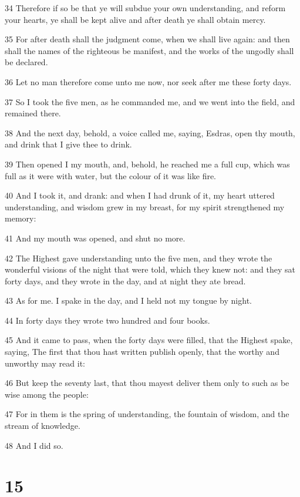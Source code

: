 \par 34 Therefore if so be that ye will subdue your own understanding, and reform your hearts, ye shall be kept alive and after death ye shall obtain mercy.
\par 35 For after death shall the judgment come, when we shall live again: and then shall the names of the righteous be manifest, and the works of the ungodly shall be declared.
\par 36 Let no man therefore come unto me now, nor seek after me these forty days.
\par 37 So I took the five men, as he commanded me, and we went into the field, and remained there.
\par 38 And the next day, behold, a voice called me, saying, Esdras, open thy mouth, and drink that I give thee to drink.
\par 39 Then opened I my mouth, and, behold, he reached me a full cup, which was full as it were with water, but the colour of it was like fire.
\par 40 And I took it, and drank: and when I had drunk of it, my heart uttered understanding, and wisdom grew in my breast, for my spirit strengthened my memory:
\par 41 And my mouth was opened, and shut no more.
\par 42 The Highest gave understanding unto the five men, and they wrote the wonderful visions of the night that were told, which they knew not: and they sat forty days, and they wrote in the day, and at night they ate bread.
\par 43 As for me. I spake in the day, and I held not my tongue by night.
\par 44 In forty days they wrote two hundred and four books.
\par 45 And it came to pass, when the forty days were filled, that the Highest spake, saying, The first that thou hast written publish openly, that the worthy and unworthy may read it:
\par 46 But keep the seventy last, that thou mayest deliver them only to such as be wise among the people:
\par 47 For in them is the spring of understanding, the fountain of wisdom, and the stream of knowledge.
\par 48 And I did so.

\chapter{15}

